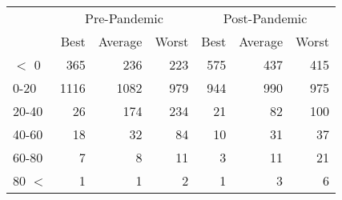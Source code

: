 
\begin{tabular}[t]{lrrrrrr}
\toprule
\multicolumn{1}{c}{ } & \multicolumn{3}{c}{Pre-Pandemic} & \multicolumn{3}{c}{Post-Pandemic} \\
\cmidrule(l{3pt}r{3pt}){2-4} \cmidrule(l{3pt}r{3pt}){5-7}
 & Best & Average & Worst & Best & Average & Worst\\
\midrule
$<$ 0 & 365 & 236 & 223 & 575 & 437 & 415\\
0-20 & 1116 & 1082 & 979 & 944 & 990 & 975\\
20-40 & 26 & 174 & 234 & 21 & 82 & 100\\
40-60 & 18 & 32 & 84 & 10 & 31 & 37\\
60-80 & 7 & 8 & 11 & 3 & 11 & 21\\
80 $<$ & 1 & 1 & 2 & 1 & 3 & 6\\
\bottomrule
\end{tabular}
